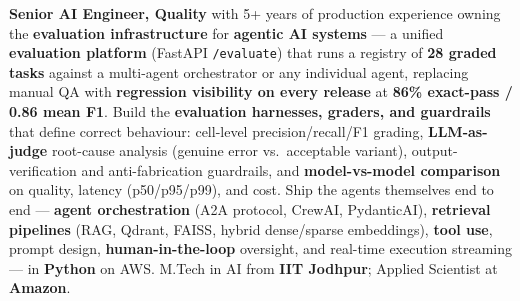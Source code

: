 \documentclass[letter,10pt]{article}
\begin{document}

\textbf{Senior AI Engineer, Quality} with 5+ years of production experience owning the \textbf{evaluation infrastructure} for \textbf{agentic AI systems} --- a unified \textbf{evaluation platform} (FastAPI \texttt{/evaluate}) that runs a registry of \textbf{28 graded tasks} against a multi-agent orchestrator or any individual agent, replacing manual QA with \textbf{regression visibility on every release} at \textbf{86\% exact-pass / 0.86 mean F1}.
Build the \textbf{evaluation harnesses, graders, and guardrails} that define correct behaviour: cell-level precision/recall/F1 grading, \textbf{LLM-as-judge} root-cause analysis (genuine error vs.\ acceptable variant), output-verification and anti-fabrication guardrails, and \textbf{model-vs-model comparison} on quality, latency (p50/p95/p99), and cost.
Ship the agents themselves end to end --- \textbf{agent orchestration} (A2A protocol, CrewAI, PydanticAI), \textbf{retrieval pipelines} (RAG, Qdrant, FAISS, hybrid dense/sparse embeddings), \textbf{tool use}, prompt design, \textbf{human-in-the-loop} oversight, and real-time execution streaming --- in \textbf{Python} on AWS.
M.Tech in AI from \textbf{IIT Jodhpur}; Applied Scientist at \textbf{Amazon}.
\end{document}
